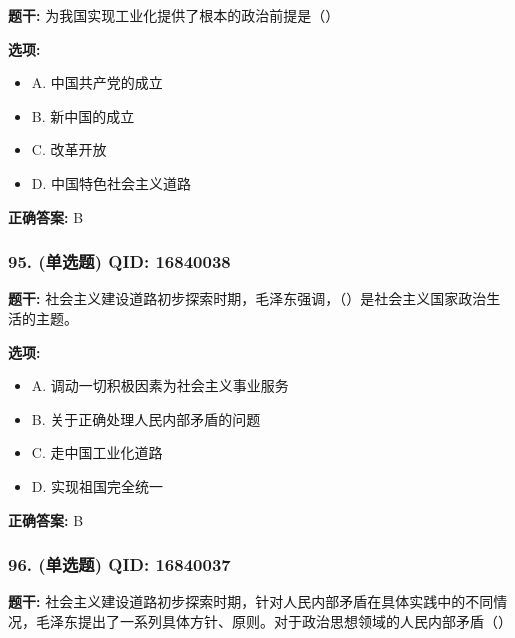 \documentclass[12pt,UTF8]{ctexart}
\begin{document}
\textbf{题干:}
为我国实现工业化提供了根本的政治前提是（）

\textbf{选项:}
\begin{itemize}[leftmargin=*]

  \item A. 中国共产党的成立

  \item B. 新中国的成立

  \item C. 改革开放

  \item D. 中国特色社会主义道路

\end{itemize}

\textbf{正确答案:}
B

\vspace{0.3em}\hrulefill\vspace{0.7em}

\subsubsection*{95. (单选题) \small QID: 16840038}

\textbf{题干:}
社会主义建设道路初步探索时期，毛泽东强调，（）是社会主义国家政治生活的主题。

\textbf{选项:}
\begin{itemize}[leftmargin=*]

  \item A. 调动一切积极因素为社会主义事业服务

  \item B. 关于正确处理人民内部矛盾的问题

  \item C. 走中国工业化道路

  \item D. 实现祖国完全统一

\end{itemize}

\textbf{正确答案:}
B

\vspace{0.3em}\hrulefill\vspace{0.7em}

\subsubsection*{96. (单选题) \small QID: 16840037}

\textbf{题干:}
社会主义建设道路初步探索时期，针对人民内部矛盾在具体实践中的不同情况，毛泽东提出了一系列具体方针、原则。对于政治思想领域的人民内部矛盾（）
\end{document}
